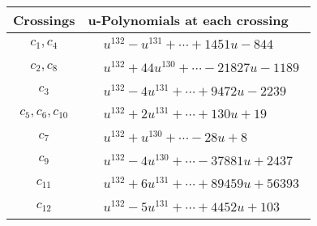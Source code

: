 \documentclass[1p]{elsarticle_modified}
\theoremstyle{definition}
\begin{document}
\begin{tabular}{m{50pt}|m{274pt}}
Crossings & \hspace{64pt}u-Polynomials at each crossing \\
\hline $$\begin{aligned}c_{1},c_{4}\end{aligned}$$&$\begin{aligned}
&u^{132}- u^{131}+\cdots+1451 u-844
\end{aligned}$\\
\hline $$\begin{aligned}c_{2},c_{8}\end{aligned}$$&$\begin{aligned}
&u^{132}+44 u^{130}+\cdots-21827 u-1189
\end{aligned}$\\
\hline $$\begin{aligned}c_{3}\end{aligned}$$&$\begin{aligned}
&u^{132}-4 u^{131}+\cdots+9472 u-2239
\end{aligned}$\\
\hline $$\begin{aligned}c_{5},c_{6},c_{10}\end{aligned}$$&$\begin{aligned}
&u^{132}+2 u^{131}+\cdots+130 u+19
\end{aligned}$\\
\hline $$\begin{aligned}c_{7}\end{aligned}$$&$\begin{aligned}
&u^{132}+u^{130}+\cdots-28 u+8
\end{aligned}$\\
\hline $$\begin{aligned}c_{9}\end{aligned}$$&$\begin{aligned}
&u^{132}-4 u^{130}+\cdots-37881 u+2437
\end{aligned}$\\
\hline $$\begin{aligned}c_{11}\end{aligned}$$&$\begin{aligned}
&u^{132}+6 u^{131}+\cdots+89459 u+56393
\end{aligned}$\\
\hline $$\begin{aligned}c_{12}\end{aligned}$$&$\begin{aligned}
&u^{132}-5 u^{131}+\cdots+4452 u+103
\end{aligned}$\\
\hline
\end{tabular}\\~\\
\end{document}
